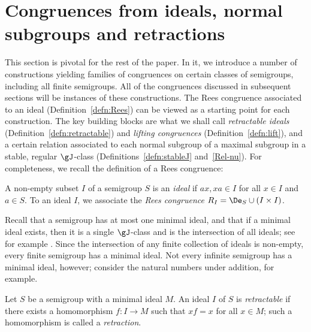 \section{Congruences from ideals, normal subgroups and retractions}\label{sec-fam}


This section is pivotal for the rest of the paper.  In it, we introduce a number of constructions yielding families of congruences on certain classes of semigroups, including all finite semigroups.  
%
All of the congruences discussed in subsequent sections will be instances of these constructions.  The Rees congruence associated to an ideal (Definition~\ref{defn:Rees}) can be viewed as a starting point for each construction.  The key building blocks are what we shall call \emph{retractable ideals} (Definition~\ref{defn:retractable}) and \emph{lifting congruences} (Definition~\ref{defn:lift}), and a certain relation associated to each normal subgroup of a maximal subgroup in a stable, regular $\gJ$-class (Definitions~\ref{defn:stableJ} and~\ref{Rel-nu}).  
%
%
For completeness, we recall the definition of a Rees congruence:

\begin{defn}\label{defn:Rees}
A non-empty subset $I$ of a semigroup $S$ is an \emph{ideal} if $ax,xa\in I$ for all $x\in I$ and $a\in S$.  To an ideal $I$, we associate the \emph{Rees congruence} $R_I=\De_S\cup(I\times I)$.
\end{defn}

Recall that a semigroup has at most one minimal ideal, and that if a minimal ideal exists, then it is a single $\gJ$-class and is the intersection of all ideals; see for example \cite[Section 3.1]{Howie}.  Since the intersection of any finite collection of ideals is non-empty, every finite semigroup has a minimal ideal.  Not every infinite semigroup has a minimal ideal, however; consider the natural numbers under addition, for example.

\begin{defn}\label{defn:retractable}
  Let $S$ be a semigroup with a minimal ideal $M$.  An ideal $I$ of $S$ is \textit{retractable} if there exists a
  homomorphism $f: I \to M$ such that $xf = x$ for all $x\in M$; such a
  homomorphism is called a \textit{retraction}. 
\end{defn}

